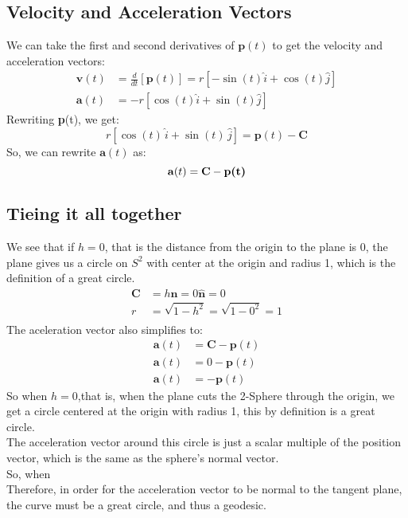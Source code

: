 \documentclass[11pt]{article}
\begin{document}
\subsection*{Velocity and Acceleration Vectors}
We can take the first and second derivatives of $\textbf{p}(t)$ to get the velocity and acceleration vectors:
\begin{align*}
    \mathbf{v}(t) & = \frac{d}{dt} \left[\textbf{p}(t)\right] =  r\left[-\sin(t) \hat{i} + \cos(t) \hat{j} \right]\\                                                               
          \mathbf{a}(t) &= -r[\cos(t)\hat{i} + \sin(t)\hat{j}] 
\end{align*}
Rewriting \textbf{p}(t), we get:
$$r[\cos(t)\,\hat{i} + \sin(t)\,\hat{j}] = \textbf{p}(t) - \mathbf{C}$$
So, we can rewrite $\mathbf{a}(t)$ as:
$$\mathbf{a}(t) = \mathbf{C} - \textbf{\textbf{p}(t)}$$
\newpage
\subsection*{Tieing it all together}
We see that if $h = 0$, that is the distance from the origin to the plane is 0, the plane gives us a circle on $S^2$ with center at the origin and radius 1, which is the definition of a great circle.
\begin{align*}
    \mathbf{C} &= h \hat{\textbf{n}} = 0 \hat{\textbf{n}} = 0  \\[1ex]
    r &= \sqrt{1- h^2} = \sqrt{1- 0^2} = 1      \\
\end{align*}
The aceleration vector also simplifies to:
\begin{align*}
    \mathbf{a}(t) & = \mathbf{C} - \textbf{p}(t) \\
    \mathbf{a}(t) & = 0 - \textbf{p}(t) \\
    \mathbf{a}(t) & = - \textbf{p}(t)
\end{align*}
So when $h = 0$,that is, when the plane cuts the 2-Sphere through the origin, we get a circle centered at the origin with radius 1, this by definition is a great circle. \\
The acceleration vector around this circle is just a scalar multiple of the position vector, which is the same as the sphere's normal vector. \\
So, when     \\[1ex]
Therefore, in order for the acceleration vector to be normal to the tangent plane, the curve must be a great circle, and thus a geodesic.
\end{document}
